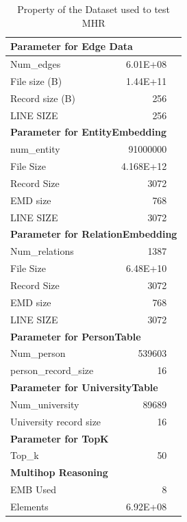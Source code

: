 \documentclass[sigconf]{acmart}
\begin{document}
\begin{table}[htbp]
  \centering
  \caption{Property of the Dataset used to test MHR}
    \begin{tabular}{lrr}
    \toprule
    \multicolumn{3}{p{17em}}{\bf Parameter for Edge Data} \\
    \midrule
    Num\_edges & 6.01E+08 &  \\
    File size (B) & 1.44E+11 &  \\
    Record size (B) & 256   &  \\
    LINE SIZE & 256   &  \\
     \midrule
    \multicolumn{3}{p{17em}}{\bf Parameter for EntityEmbedding} \\
     \midrule
    \multicolumn{1}{p{9.715em}}{num\_entity} & 91000000 &  \\
    \multicolumn{1}{p{9.715em}}{File Size} & 4.168E+12 &  \\
    \multicolumn{1}{p{9.715em}}{Record Size} & 3072  &  \\
    EMD size & 768   &  \\
    LINE SIZE & 3072  &  \\
     \midrule
    \multicolumn{3}{p{17em}}{\bf Parameter for RelationEmbedding} \\
     \midrule
    Num\_relations & 1387  &  \\
    File Size & 6.48E+10 &  \\
    Record Size & 3072  &  \\
    EMD size & 768   &  \\
    LINE SIZE & 3072  &  \\
     \midrule
    \multicolumn{3}{p{17em}}{\bf Parameter for PersonTable} \\
     \midrule
    Num\_person & 539603 &  \\
    person\_record\_size & 16    &  \\
           \midrule
    \multicolumn{3}{p{17em}}{\bf Parameter for UniversityTable} \\
     \midrule
    Num\_university & 89689 &  \\
    University record size & 16    &  \\
           \midrule
   \multicolumn{3}{p{17em}}{\bf Parameter for TopK} \\
     \midrule
    Top\_k & 50    &  \\
           \midrule
    \multicolumn{3}{p{17em}}{\bf Multihop Reasoning} \\
     \midrule
    EMB Used & 8   &  \\
    Elements & 6.92E+08 &  \\
    \bottomrule
    \end{tabular}%
  \label{tab:datastats}%
\end{table}%
\end{document}
